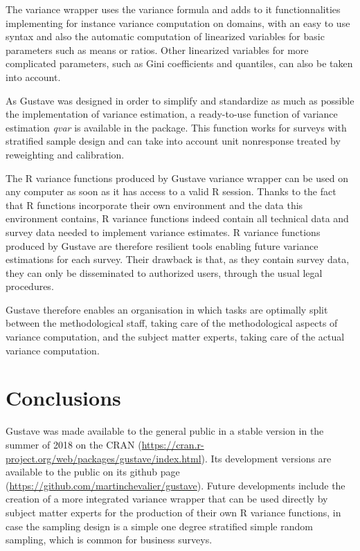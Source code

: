 \documentclass[12pt,a4paper]{article}
\begin{document}
\par The variance wrapper uses the variance formula and adds to it functionnalities implementing for instance variance computation on domains, with an easy to use syntax and also the automatic computation of linearized variables for basic parameters such as means or ratios. Other linearized variables for more complicated parameters, such as Gini coefficients and quantiles, can also be taken into account.\\

\par As Gustave was designed in order to simplify and standardize as much as possible the implementation of variance estimation, a ready-to-use function of variance estimation \textit{qvar} is available in the package. This function works for surveys with stratified sample design and can take into account unit nonresponse treated by reweighting and calibration. \\

\par The R variance functions produced by Gustave variance wrapper can be used on any computer as soon as it has access to a valid R session. Thanks to the fact that R functions incorporate their own environment and the data this environment contains, R variance functions indeed contain all technical data and survey data needed to implement variance estimates. R variance functions produced by Gustave are therefore resilient tools enabling future variance estimations for each survey. Their drawback is that, as they contain survey data, they can only be disseminated to authorized users, through the usual legal procedures.\\

\par Gustave therefore enables an organisation in which tasks are optimally split between the methodological staff, taking care of the methodological aspects of variance computation, and the subject matter experts, taking care of the actual variance computation. 


\section{Conclusions}

\par Gustave was made available to the general public in a stable version in the summer of 2018 on the CRAN (\url{https://cran.r-project.org/web/packages/gustave/index.html}). Its development versions are available to the public on its github page (\url{https://github.com/martinchevalier/gustave}). Future developments include the creation of a more integrated variance wrapper that can be used directly by subject matter experts for the production of their own R variance functions, in case the sampling design is a simple one degree stratified simple random sampling, which is common for business surveys.
\end{document}
